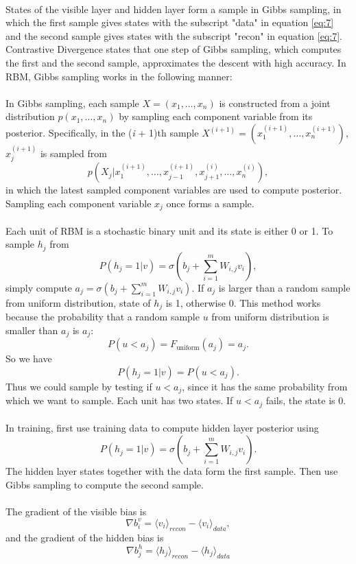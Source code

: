 \documentclass[12pt]{article}
\begin{document}
\\
States of the visible layer and hidden layer form a sample in Gibbs sampling, in which  the first sample gives states with the subscript "data" in equation \eqref{eq:7}  and the second sample gives states with the subscript "recon" in equation \eqref{eq:7}. Contrastive Divergence states that one step of Gibbs sampling, which computes the first and the second sample, approximates the descent with high accuracy. In RBM, Gibbs sampling works in the following manner:\\
\\
In Gibbs sampling, each sample $X = (x_1, \dots, x_n)$ is constructed from a joint distribution $\left.p(x_1, \dots, x_n)\right.$ by sampling each component variable from its posterior. Specifically, in the (\emph{i} + 1)th sample $X^{(i+1)} = (x_1^{(i+1)}, \dots, x_n^{(i+1)})$, $x_j^{(i+1)}$ is sampled from \begin{equation}
p(X_j|x_1^{(i+1)},\dots,x_{j-1}^{(i+1)},x_{j+1}^{(i)},\dots,x_n^{(i)}),
\end{equation}
in which the latest sampled component variables are used to compute posterior. Sampling each component variable $x_j$ once forms a sample.\\
\\
Each unit of RBM is a stochastic binary unit and its state is either 0 or 1. To sample $h_j$ from \begin{equation}
P(h_j=1|v) = \sigma \left(b_j + \sum_{i=1}^m W_{i,j} v_i \right),
\end{equation}
simply compute $a_j = \sigma \left(b_j + \sum_{i=1}^m W_{i,j} v_i \right)$. If $a_j$ is larger than a random sample from uniform distribution, state of $h_j$ is 1, otherwise 0. This method works because the probability that a random sample $u$ from uniform distribution is smaller than $a_j$  is $a_j$: \begin{equation}
P(u < a_j) = F_{\text{uniform}}(a_j) = a_j.
\end{equation}
So we have \begin{equation}
P(h_j=1|v) = P(u < a_j).
\end{equation}
Thus we could sample by testing if $u < a_j$, since it has the same probability from which we want to sample. Each unit has two states. If $u < a_j$ fails, the state is 0.\\
\\
In training, first use training data to compute hidden layer posterior using \begin{equation}
P(h_j=1|v) = \sigma \left(b_j + \sum_{i=1}^m W_{i,j} v_i \right).
\end{equation}
The hidden layer states together with the data form the first sample. Then use Gibbs sampling to compute the second sample.\\
\\
The gradient of the visible bias is \begin{equation}
\nabla b^v_{i} = \langle v_i\rangle_{recon} - \langle v_i\rangle_{data},
\end{equation}
and the gradient of the hidden bias is \begin{equation}
\nabla b^h_{j} = \langle h_j\rangle_{recon} - \langle h_j\rangle_{data}
\end{equation}
\end{document}
